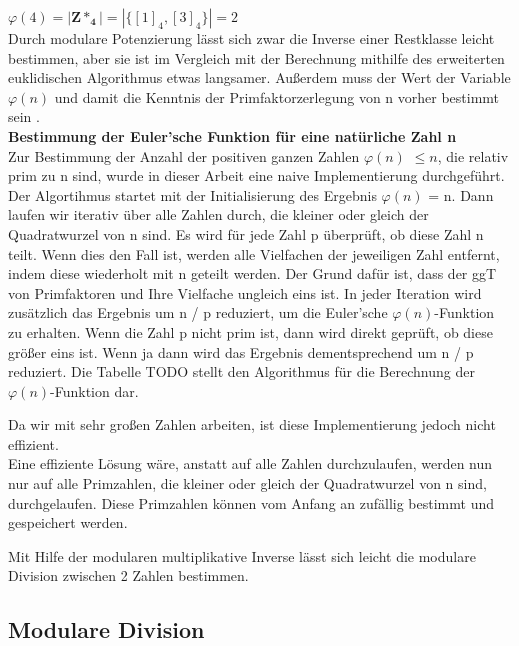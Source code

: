 \(\varphi(4) = |\mathbf{Z*_4}| = |\{ [1]_4, [3]_4 \}| = 2\) \\

Durch modulare Potenzierung lässt sich zwar die Inverse einer
Restklasse leicht bestimmen, aber sie ist im Vergleich mit der
Berechnung mithilfe des erweiterten euklidischen Algorithmus etwas
langsamer. Außerdem muss der Wert der Variable \(\varphi(n)\) und
damit die Kenntnis der Primfaktorzerlegung von n vorher bestimmt
sein \cite{langMIE}. \\

\textbf{Bestimmung der Euler'sche Funktion für eine natürliche Zahl n } \\

Zur Bestimmung der Anzahl der positiven ganzen Zahlen \(\varphi(n)\)  $ \leq n $, die relativ prim zu n sind, wurde in dieser Arbeit eine naive
Implementierung durchgeführt.\\
Der Algortihmus startet mit der Initialisierung des Ergebnis
\(\varphi(n)\) = n. Dann laufen wir iterativ über alle Zahlen durch, die kleiner oder gleich der Quadratwurzel von n
sind. Es wird für jede Zahl p überprüft, ob diese
Zahl n teilt. Wenn dies den Fall ist, werden alle Vielfachen der
jeweiligen Zahl entfernt, indem diese wiederholt mit n geteilt
werden. Der Grund dafür ist, dass der ggT von Primfaktoren und Ihre Vielfache ungleich eins ist.
In jeder Iteration wird zusätzlich das Ergebnis um n / p
reduziert, um die Euler'sche \(\varphi(n)\)-Funktion zu erhalten.
Wenn die Zahl p nicht prim ist, dann wird direkt geprüft, ob diese größer eins ist. Wenn ja dann wird das Ergebnis dementsprechend um n / p reduziert. Die Tabelle TODO stellt den Algorithmus für die Berechnung der \(\varphi(n)\)-Funktion dar.




Da wir mit sehr großen Zahlen arbeiten, ist diese Implementierung jedoch nicht effizient. \\
Eine effiziente Lösung wäre, anstatt auf alle Zahlen durchzulaufen, werden nun nur auf alle  Primzahlen, die kleiner oder gleich der Quadratwurzel von n sind, durchgelaufen. Diese Primzahlen können vom Anfang an zufällig bestimmt und gespeichert werden. 

Mit Hilfe der modularen multiplikative Inverse lässt sich leicht die modulare Division zwischen 2 Zahlen bestimmen.

\subsection{Modulare Division}

